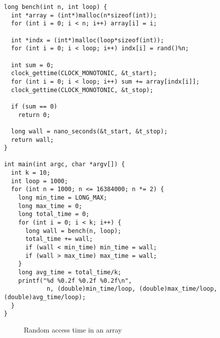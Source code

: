 \documentclass[a4paper,11pt]{article}
\begin{document}
\begin{verbatim}
long bench(int n, int loop) {
  int *array = (int*)malloc(n*sizeof(int));
  for (int i = 0; i < n; i++) array[i] = i;
  
  int *indx = (int*)malloc(loop*sizeof(int));
  for (int i = 0; i < loop; i++) indx[i] = rand()%n;

  int sum = 0;
  clock_gettime(CLOCK_MONOTONIC, &t_start);
  for (int i = 0; i < loop; i++) sum += array[indx[i]];
  clock_gettime(CLOCK_MONOTONIC, &t_stop);

  if (sum == 0)
    return 0;

  long wall = nano_seconds(&t_start, &t_stop);
  return wall;
}

int main(int argc, char *argv[]) {
  int k = 10;
  int loop = 1000;
  for (int n = 1000; n <= 16384000; n *= 2) {
    long min_time = LONG_MAX;
    long max_time = 0;
    long total_time = 0;
    for (int i = 0; i < k; i++) {
      long wall = bench(n, loop);
      total_time += wall;
      if (wall < min_time) min_time = wall;
      if (wall > max_time) max_time = wall;
    }
    long avg_time = total_time/k;
    printf("%d %0.2f %0.2f %0.2f\n", 
            n, (double)min_time/loop, (double)max_time/loop, (double)avg_time/loop);
  }
}
\end{verbatim}

\begin{figure}[H]
  \centering
  \caption{Random access time in an array}
  \label{fig:random_access}
\end{figure}
\end{document}
